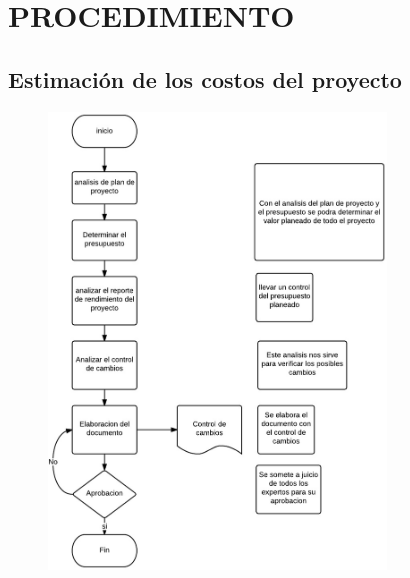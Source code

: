 \chapter{PROCEDIMIENTO}

\section{Estimaci\'on de los costos del proyecto}
%
\begin{figure}[H]
    \centering
    \includegraphics[width=0.8\textwidth]{images/estimacioncostos.png}
\end{figure}
%
